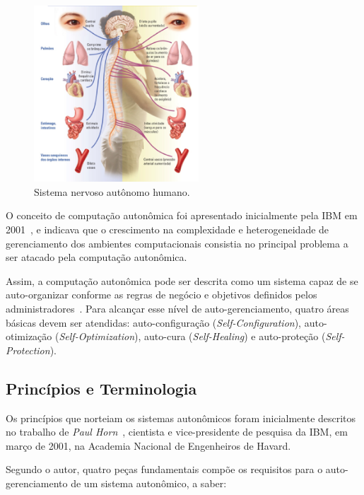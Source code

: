 \documentclass[11pt,twoside]{article}
\begin{document}
\begin{figure}
    \centering
    \includegraphics[width=0.55\textwidth]{Picture1.png}
    \caption{Sistema nervoso autônomo humano.}
    \label{Sec:Intro:Fig1}
\end{figure}

O conceito de computação autonômica foi apresentado inicialmente pela IBM em 2001~\cite{KEPHART}, e indicava que o crescimento na complexidade e heterogeneidade de gerenciamento dos ambientes computacionais consistia no principal problema a ser atacado pela computação autonômica. 

Assim, a computação autonômica pode ser descrita como um sistema capaz de se auto-organizar conforme as regras de negócio e objetivos definidos pelos administradores~\cite{ROMILDO}. Para alcançar esse nível de auto-gerenciamento, quatro áreas básicas devem ser atendidas: auto-configuração (\textit{Self-Configuration}), auto-otimização (\textit{Self-Optimization}), auto-cura (\textit{Self-Healing}) e auto-proteção (\textit{Self-Protection}).

\subsection{Princípios e Terminologia}
Os princípios que norteiam os sistemas autonômicos foram inicialmente descritos no trabalho de \textit{Paul Horn}~\cite{KEPHART}, cientista e vice-presidente de pesquisa da IBM, em março de 2001, na Academia Nacional de Engenheiros de Havard. 

Segundo o autor, quatro peças fundamentais compõe os requisitos para o auto-gerenciamento de um sistema autonômico, a saber:
\end{document}
